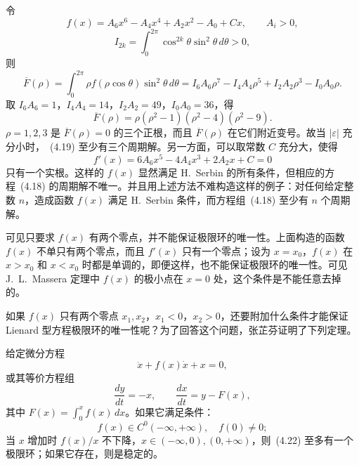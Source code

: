 令
\[
f(x)=A_6x^6-A_4x^4+A_2x^2-A_0+Cx,\qquad A_i>0,
\]
\[
I_{2k}=\int_0^{2\pi}\cos^{2k}\theta\sin^2\theta\,d\theta>0,
\]
则
\[
\overline{F}(\rho)=\int_0^{2\pi}\rho f(\rho\cos\theta)\sin^2\theta\,d\theta
=I_6A_6\rho^7-I_4A_4\rho^5+I_2A_2\rho^3-I_0A_0\rho.
\]
取 $I_6A_6=1$，$I_4A_4=14$，$I_2A_2=49$，$I_0A_0=36$，得
\[
\overline{F}(\rho)=\rho(\rho^2-1)(\rho^2-4)(\rho^2-9).
\]
$\rho=1,2,3$ 是 $\overline{F}(\rho)=0$ 的三个正根，而且 $\overline{F}(\rho)$ 在它们附近变号。故当 $|\varepsilon|$ 充分小时，~(4.19) 至少有三个周期解。另一方面，可以取常数 $C$ 充分大，使得
\[
f'(x)=6A_6x^5-4A_4x^3+2A_2x+C=0
\]
只有一个实根。这样的 $f(x)$ 显然满足 H.~Serbin 的所有条件，但相应的方程~(4.18) 的周期解不唯一。并且用上述方法不难构造这样的例子：对任何给定整数 $n$，造成函数 $f(x)$ 满足 H.~Serbin 条件，而方程组~(4.18) 至少有 $n$ 个周期解。

可见只要求 $f(x)$ 有两个零点，并不能保证极限环的唯一性。上面构造的函数 $f(x)$ 不单只有两个零点，而且 $f'(x)$ 只有一个零点；设为 $x=x_0$，$f(x)$ 在 $x>x_0$ 和 $x<x_0$ 时都是单调的，即便这样，也不能保证极限环的唯一性。可见 J.~L.~Massera 定理中 $f(x)$ 的极小点在 $x=0$ 处，这个条件是不能任意去掉的。

如果 $f(x)$ 只有两个零点 $x_1,x_2$，$x_1<0$，$x_2>0$，还要附加什么条件才能保证 Lienard 型方程极限环的唯一性呢？为了回答这个问题，张芷芬证明了下列定理。

\begin{theorem}{}{ }
给定微分方程
\[
\ddot{x}+f(x)\dot{x}+x=0, \tag{4.21}
\]
或其等价方程组
\[
\dfrac{dy}{dt}=-x,\qquad \dfrac{dx}{dt}=y-F(x), \tag{4.22}
\]
其中 $F(x)=\displaystyle\int_0^xf(x)\,dx$。如果它满足条件：
\[
f(x)\in C^0(-\infty,+\infty),\quad f(0)\ne0;
\]
当 $x$ 增加时 $f(x)/x$ 不下降，$x\in(-\infty,0),(0,+\infty)$，则~(4.22) 至多有一个极限环；如果它存在，则是稳定的。
\end{theorem}

